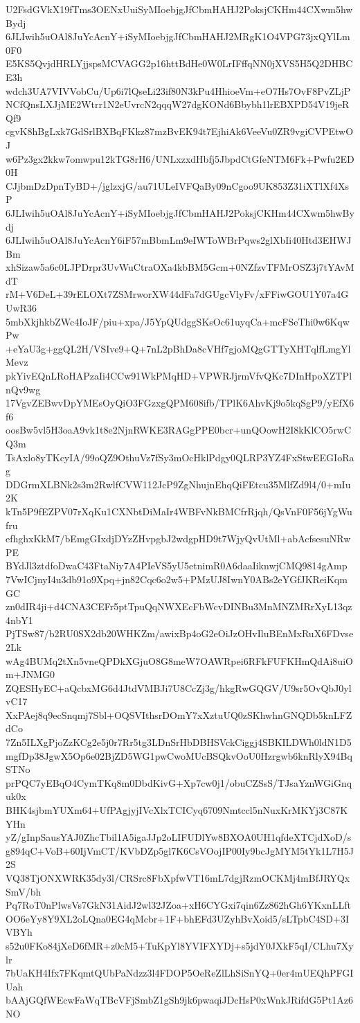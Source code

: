 U2FsdGVkX19fTms3OENxUuiSyMIoebjgJfCbmHAHJ2PoksjCKHm44CXwm5hwBydj
6JLIwih5uOAl8JuYcAcnY+iSyMIoebjgJfCbmHAHJ2MRgK1O4VPG73jxQYlLm0F0
E5KS5QvjdHRLYjjspsMCVAGG2p16httBdHe0W0LrIFffqNN0jXVS5H5Q2DHBCE3h
wdch3UA7VIVVobCu/Up6i7lQseLi23if80N3kPu4HhioeVm+eO7Hs7OvF8PvZLjP
NCfQnsLXJjME2Wtrr1N2eUvrcN2qqqW27dgKONd6Bbybh1lrEBXPD54V19jeRQf9
cgvK8hBgLxk7GdSrlBXBqFKkz87mzBvEK94t7EjhiAk6VeeVu0ZR9vgiCVPEtwOJ
w6Pz3gx2kkw7omwpu12kTG8rH6/UNLxzxdHbfj5JbpdCtGfeNTM6Fk+Pwfu2ED0H
CJjbmDzDpnTyBD+/jglzxjG/au71ULeIVFQaBy09nCgoo9UK853Z31iXTlXf4XsP
6JLIwih5uOAl8JuYcAcnY+iSyMIoebjgJfCbmHAHJ2PoksjCKHm44CXwm5hwBydj
6JLIwih5uOAl8JuYcAcnY6iF57mBbmLm9eIWToWBrPqws2glXbIi40Htd3EHWJBm
xhSizaw5a6c0LJPDrpr3UvWuCtraOXa4kbBM5Gcm+0NZfzvTFMrOSZ3j7tYAvMdT
rM+V6DeL+39rELOXt7ZSMrworXW44dFa7dGUgcVlyFv/xFFiwGOU1Y07a4GUwR36
5mbXkjhkbZWc4IoJF/piu+xpa/J5YpQUdggSKsOc61uyqCa+mcFSeThi0w6KqwPw
+eYaU3g+ggQL2H/VSIve9+Q+7nL2pBhDa8cVHf7gjoMQgGTTyXHTqlfLmgYlMevz
pkYivEQnLRoHAPzaIi4CCw91WkPMqHD+VPWRJjrmVfvQKc7DInHpoXZTPlnQv9wg
17VgvZEBwvDpYMEsOyQiO3FGzxgQPM608ifb/TPlK6AhvKj9o5kqSgP9/yEfX6f6
oosBw5vl5H3oaA9vk1t8e2NjnRWKE3RAGgPPE0bcr+unQOowH2I8kKlCO5rwCQ3m
TsAxlo8yTKcyIA/99oQZ9OthuVz7fSy3mOcHklPdgy0QLRP3YZ4FxStwEEGIoRag
DDGrmXLBNk2s3m2RwlfCVW112JcP9ZgNhujnEhqQiFEtcu35MlfZd9l4/0+mIu2K
kTn5P9fEZPV07rXqKu1CXNbtDiMaIr4WBFvNkBMCfrRjqh/QsVnF0F56jYgWufru
efhghxKkM7/bEmgGIxdjDYzZHvpgbJ2wdgpHD9t7WjyQvUtMl+abAcfsesuNRwPE
BYdJl3ztdfoDwaC43FtaNiy7A4PIeVS5yU5etnimR0A6daaIiknwjCMQ9814gAmp
7VwICjnyI4u3db91o9Xpq+jn82Cqc6o2w5+PMzUJ8IwnY0ABs2eYGfJKReiKqmGC
zn0dIR4ji+d4CNA3CEFr5ptTpuQqNWXEcFbWcvDINBu3MnMNZMRrXyL13qz4nbY1
PjTSw87/b2RU0SX2db20WHKZm/awixBp4oG2eOiJzOHvIluBEnMxRuX6FDvse2Lk
wAg4BUMq2tXn5vneQPDkXGjuO8G8meW7OAWRpei6RFkFUFKHmQdAi8uiOm+JNMG0
ZQESHyEC+aQcbxMG6d4JtdVMBJi7U8CcZj3g/hkgRwGQGV/U9sr5OvQbJ0ylvC17
XxPAej8q9ecSnqmj7Sbl+OQSVIthsrDOmY7xXztuUQ0zSKhwhnGNQDb5knLFZdCo
7Zn5ILXgPjoZzKCg2e5j0r7Rr5tg3LDnSrHbDBHSVckCiggj4SBKILDWh0ldN1D5
mgfDp38JgwX5Op6e02BjZD5WG1pwCwoMUcBSQkvOoU0Hzrgwb6knRlyX94BqSTNo
prPQC7yEBqO4CymTKq8m0DbdKivG+Xp7cw0j1/obuCZSsS/TJsaYznWGiGnquk0x
BHK4sjbmYUXm64+UfPAgjyjIVcXlxTCICyq6709Nmtccl5nNuxKrMKYj3C87KYHn
yZ/gInpSausYAJ0ZhcTbil1A5igaJJp2oLIFUDlYw8BXOA0UH1qfdeXTCjdXoD/s
g894qC+VoB+60IjVmCT/KVbDZp5gl7K6CsVOojIP00Iy9bcJgMYM5tYk1L7H5J2S
VQ38TjONXWRK35dy3l/CRSrc8FbXpfwVT16mL7dgjRzmOCKMj4mBfJRYQxSmV/bh
Pq7RoT0nPlwsVs7GkN31AidJ2wl32JZoa+xH6CYGxi7qin6Zz862hGh6YKxnLLft
OO6eYy8Y9XL2oLQna0EG4qMcbr+1F+bhEFd3UZyhBvXoid5/sLTpbC4SD+3IVBYh
s52u0FKo84jXeD6fMR+z0cM5+TuKpYl8YVIFXYDj+s5jdY0JXkF5qI/CLhu7Xylr
7bUaKH4Ifx7FKqmtQUbPaNdzz3l4FDOP5OeReZlLhSiSnYQ+0er4mUEQhPFGIUah
bAAjGQfWEcwFaWqTBcVFjSmbZ1gSh9jk6pwaqiJDcHsP0xWnkJRifdG5Pt1Az6NO
